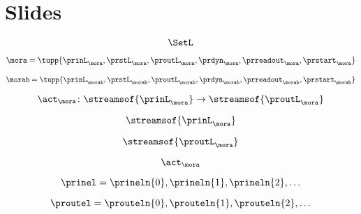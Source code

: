
\section{Slides}

\begin{forslides}

    \begin{equation}
        \label{eq:slides-processes-000}
        \SetL
    \end{equation}

    \begin{equation}
        \label{eq:slides-processes-00}
        \mora = \tupp{\prinL_\mora,\prstL_\mora,\proutL_\mora,\prdyn_\mora,\prreadout_\mora,\prstart_\mora}
    \end{equation}

    \begin{equation}
        \label{eq:slides-processes-00b}
        \morab = \tupp{\prinL_{\morab},\prstL_{\morab},\proutL_{\morab},\prdyn_{\morab},\prreadout_{\morab},\prstart_{\morab}}
    \end{equation}

    \begin{equation}
        \label{eq:slides-processes-01}
        \act_{\mora} \colon \streamsof{\prinL_\mora}  \to \streamsof{\proutL_\mora}
    \end{equation}

    \begin{equation}
        \label{eq:slides-processes-02}
        \streamsof{\prinL_\mora}
    \end{equation}

    \begin{equation}
        \label{eq:slides-processes-03}
        \streamsof{\proutL_\mora}
    \end{equation}

    \begin{equation}
        \label{eq:slides-processes-04}
        \act_{\mora}
    \end{equation}

    \begin{equation}
        \label{eq:slides-processes-05}
        \prinel = \prineln{0}, \prineln{1}, \prineln{2}, \ldots
    \end{equation}

    \begin{equation}
        \label{eq:slides-processes-05b}
        \proutel = \prouteln{0}, \prouteln{1}, \prouteln{2}, \ldots
    \end{equation}


\end{forslides}
